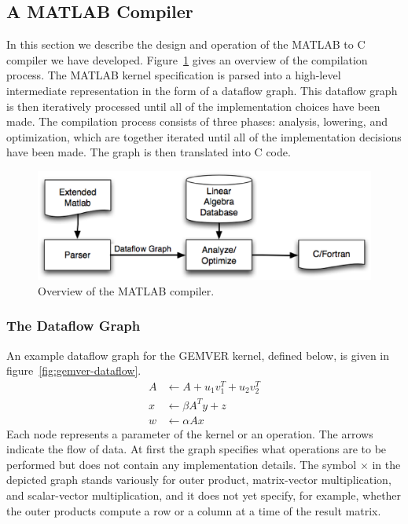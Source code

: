 \documentclass[runningheads]{llncs}
\begin{document}
\subsection{A MATLAB Compiler}
\label{sec:matlab}

In this section we describe the design and operation of the MATLAB to C compiler we have developed.    Figure~\ref{fig:compiler} gives an overview of the compilation process. The MATLAB kernel specification is parsed into a high-level intermediate representation in the form of a dataflow graph.  This dataflow graph is then iteratively processed until all of the implementation choices have been made.  The compilation process consists of three phases: analysis, lowering, and optimization, which are together iterated until all of the implementation decisions have been made.  The graph is then translated into C code.

\begin{figure}[htbp]
\centering
\includegraphics[width=.7\textwidth]{figures/compile.eps}

\caption{Overview of the MATLAB compiler.}
\label{fig:compiler}
\end{figure}

\subsubsection{The Dataflow Graph}

An example dataflow graph for the GEMVER kernel, defined below, is given in figure~\ref{fig:gemver-dataflow}.
\begin{align*}
  A &\gets A + u_1 v_1^T + u_2 v_2^T \\[-0.5ex]
  x &\gets \beta A^T y + z \\[-0.5ex]
  w &\gets \alpha A x
\end{align*}
Each node represents a parameter of the kernel or an operation.  The arrows indicate the flow of data. At first the graph specifies what operations are to be performed but does not contain any implementation details. The symbol $\times$ in the depicted graph stands variously for outer product, matrix-vector multiplication, and scalar-vector multiplication, and it does not yet specify, for example, whether the outer products compute a row or a column at a time of the result matrix.
\end{document}
